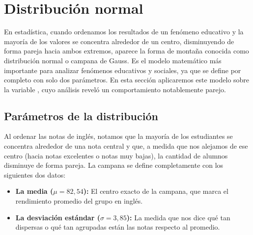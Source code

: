 \section{Distribución normal}
En estadística, cuando ordenamos los resultados de un fenómeno educativo y la mayoría de los
valores se concentra alrededor de un centro, disminuyendo de forma pareja hacia ambos extremos,
aparece la forma de montaña conocida como distribución normal o campana de Gauss. Es el modelo
matemático más importante para analizar fenómenos educativos y sociales, ya que se define por
completo con solo dos parámetros. En esta sección aplicaremos este modelo sobre la variable
, cuyo análisis reveló un comportamiento notablemente parejo.

\subsection{Parámetros de la distribución}
Al ordenar las notas de inglés, notamos que la mayoría de los estudiantes se concentra alrededor
de una nota central y que, a medida que nos alejamos de ese centro (hacia notas excelentes o notas
muy bajas), la cantidad de alumnos disminuye de forma pareja. La campana se define completamente
con los siguientes dos datos:
\begin{itemize}
	\item \textbf{La media ($\mu = 82{,}54$):} El centro exacto de la campana, que marca el
	rendimiento promedio del grupo en inglés.
	\item \textbf{La desviación estándar ($\sigma = 3{,}85$):} La medida que nos dice qué tan
	dispersas o qué tan agrupadas están las notas respecto al promedio.
\end{itemize}

